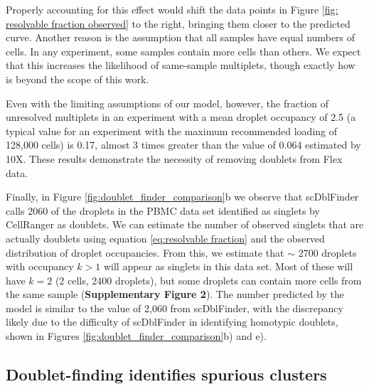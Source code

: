 \documentclass[unnumsec,webpdf,modern,large]{oup-authoring-template}
\begin{document}
	 Properly accounting for this effect would shift the data points in Figure \ref{fig: resolvable fraction observed} to the right, bringing them closer to the predicted curve. 	
	Another reason is the assumption that all samples have equal numbers of cells. 
	In any experiment, some samples contain more cells than others. We expect that this increases the likelihood of same-sample multiplets, though exactly how is beyond the scope of this work. 
	
	Even with the limiting assumptions of our model, however, the fraction of unresolved multiplets in an experiment with a mean droplet occupancy of 2.5 (a typical value for an experiment with the maximum recommended loading of 128,000 cells) is 0.17, almost 3 times greater than the value of 0.064 estimated by 10X. These results demonstrate the necessity of removing doublets from Flex data. 
		
	Finally, in Figure \ref{fig:doublet_finder_comparison}b we observe that scDblFinder calls 2060 of the droplets in the PBMC data set identified as singlets by CellRanger as doublets. 
	We can estimate the number of observed singlets that are actually doublets using equation \eqref{eq:resolvable fraction} and the observed distribution of droplet occupancies. 
	From this, we estimate that $\sim$ 2700 droplets with occupancy $k > 1$ will appear as singlets in this data set. 
	Most of these will have $k=2$ (2 cells, 2400 droplets), but some droplets can contain more cells from the same sample (\textbf{Supplementary Figure 2}). 
	The number predicted by the model is similar to the value of 2,060 from scDblFinder, with the discrepancy likely due to the difficulty of scDblFinder in identifying homotypic doublets, shown in Figures \ref{fig:doublet_finder_comparison}b) and e).
	
	\subsection{Doublet-finding identifies spurious clusters}
	
\end{document}
